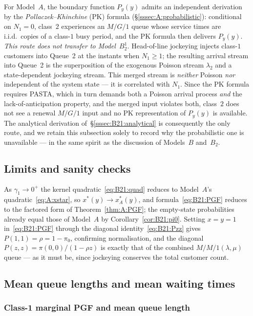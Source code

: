 For Model~$A$, the boundary function $P_y(y)$ admits an independent derivation by the
\emph{Pollaczek--Khinchine} (PK) formula (\S\ref{sssec:A:probabilistic}): conditional on
$N_1=0$, class~$2$ experiences an $M/G/1$ queue whose service times are i.i.d.\ copies of a
class-$1$ busy period, and the PK formula then delivers $P_y(y)$. \emph{This route does not
transfer to Model~$B_2^1$.} Head-of-line jockeying injects class-$1$ customers into Queue~2
at the instants when $N_1\ge1$; the resulting arrival stream into Queue~2 is the
superposition of the exogenous Poisson stream $\lambda_2$ and a state-dependent jockeying
stream. This merged stream is \emph{neither} Poisson \emph{nor} independent of the system
state --- it is correlated with $N_1$. Since the PK formula requires PASTA, which in turn
demands both a Poisson arrival process \emph{and} the lack-of-anticipation property, and the
merged input violates both, class~$2$ does not see a renewal $M/G/1$ input and no PK
representation of $P_y(y)$ is available. The analytical derivation
of~\S\ref{sssec:B21:analytical} is consequently the only route, and we retain this
subsection solely to record why the probabilistic one is unavailable --- in the same spirit
as the discussion of Models~$B$ and~$B_2$.

\subsection{Limits and sanity checks}

As $\gamma_1\to0^+$ the kernel quadratic~\eqref{eq:B21:quad} reduces to Model~$A$'s
quadratic~\eqref{eq:A:xstar}, so $x^*(y)\to x_A^*(y)$, and formula~\eqref{eq:B21:PGF}
reduces to the factored form of Theorem~\ref{thm:A:PGF}; the empty-state probabilities
already equal those of Model~$A$ by Corollary~\ref{cor:B21:pi0}. Setting $x=y=1$
in~\eqref{eq:B21:PGF} through the diagonal identity~\eqref{eq:B21:Pzz} gives
$P(1,1)=\rho=1-\pi_0$, confirming normalisation, and the diagonal
$P(z,z)=\pi(0,0)/(1-\rho z)$ is exactly that of the combined $M/M/1(\lambda,\mu)$
queue --- as it must be, since jockeying conserves the total customer count.

\subsection{Mean queue lengths and mean waiting times}

\subsubsection{Class-1 marginal PGF and mean queue length}

